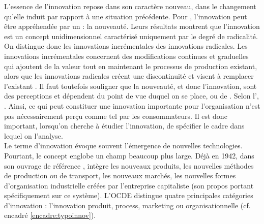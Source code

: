     L’essence de l’innovation repose dans son caractère nouveau, dans le changement qu’elle induit par rapport à une situation précédente. Pour \textcite{johannessen2001innovation}, l’innovation peut être appréhendée par un  : la nouveauté. Leurs résultats montrent que l’innovation est un concept unidimensionnel caractérisé uniquement par le degré de radicalité. On distingue donc les innovations incrémentales des innovations radicales. Les innovations incrémentales concernent des modifications continues et graduelles qui ajoutent de la valeur tout en maintenant le processus de production existant, alors que les innovations radicales créent une discontinuité et visent à remplacer l’existant \parencite{carrillo-hermosilla2010diversity}. Il faut toutefois souligner que la nouveauté, et donc l’innovation, sont des perceptions et dépendent du point de vue duquel on se place, ou de  \parencite{johannessen2001innovation}. Selon l'\textcite{oecd2015innovation}, . Ainsi, ce qui peut constituer une innovation importante pour l’organisation n’est pas nécessairement perçu comme tel par les consommateurs.  Il est donc important, lorsqu’on cherche à étudier l’innovation, de spécifier le cadre dans lequel on l’analyse. \\



    Le terme d’innovation évoque souvent l’émergence de nouvelles technologies. Pourtant, le concept englobe un champ beaucoup plus large. Déjà en 1942, dans son ouvrage de référence , \textcite[][p.83]{schumpeter2006capitalism} intègre les nouveaux produits, les nouvelles méthodes de production ou de transport, les nouveaux marchés, les nouvelles formes d’organisation industrielle créées par l’entreprise capitaliste (son propos portant spécifiquement sur ce système). L’OCDE distingue quatre principales catégories d’innovation : l’innovation produit, process, marketing ou organisationnelle (cf. encadré \ref{encadre:typoinnov}). \\

